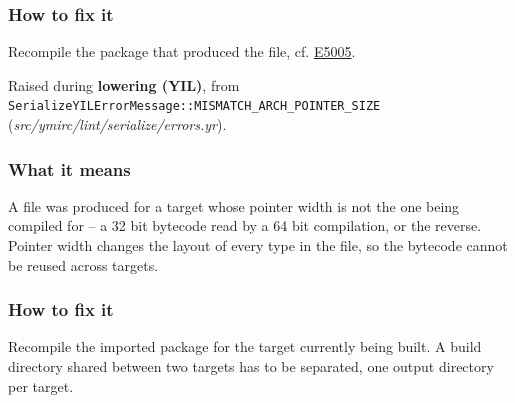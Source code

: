 \subsubsection*{How to fix it}

Recompile the package that produced the file, cf. \hyperref[sec:codes:e5005]{E5005}.

\label{sec:codes:e5010}

Raised during \textbf{lowering (YIL)}, from \texttt{SerializeYILErrorMessage::\allowbreak{}MISMATCH\_\allowbreak{}ARCH\_\allowbreak{}POINTER\_\allowbreak{}SIZE} (\textit{src/\allowbreak{}ymirc/\allowbreak{}lint/\allowbreak{}serialize/\allowbreak{}errors.yr}).

\subsubsection*{What it means}

A  file was produced for a target whose pointer width is not the one being compiled for -- a 32 bit bytecode read by a 64 bit compilation, or the reverse. Pointer width changes the layout of every type in the file, so the bytecode cannot be reused across targets.

\subsubsection*{How to fix it}

Recompile the imported package for the target currently being built. A build directory shared between two targets has to be separated, one output directory per target.
